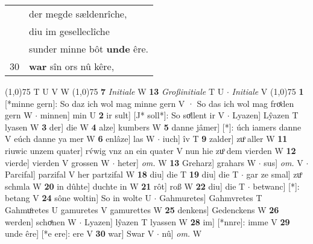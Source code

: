 \documentclass[8pt,a4paper,notitlepage]{article}
\begin{document}
\begin{table}[ht]
\begin{minipage}[t]{0.5\linewidth}
\begin{tabular}{rl}
 & der megde sældenrîche,\\ 
 & diu im geselleclîche\\ 
 & sunder minne bôt \textbf{unde} êre.\\ 
30 & \textbf{war} sîn ors nû kêre,\\ 
\end{tabular}
\scriptsize
\line(1,0){75} \newline
T U V W \newline
\line(1,0){75} \newline
\textbf{7} \textit{Initiale} W  \textbf{13} \textit{Großinitiale} T U   $\cdot$ \textit{Initiale} V  \newline
\line(1,0){75} \newline
\textbf{1} [*minne gern]: So daz ich wol mag minne gern V · So das ich wol mag froͤden gern W  $\cdot$ minnen] min U \textbf{2} ir sult] [J* soll*]: So soͤllent ir V  $\cdot$ Lyazen] Lŷazen T lyasen W \textbf{3} der] die W \textbf{4} alze] kumbers W \textbf{5} danne jâmer] [*]: úch iamers danne V eúch danne ya mer W \textbf{6} enlâze] las W  $\cdot$ iuch] îv T \textbf{9} zalder] zuͦ aller W \textbf{11} riuwic unzem quater] rv́wig vnz an ein quater V nun hie zuͦ dem vierden W \textbf{12} vierde] vierden V grossen W  $\cdot$ heter] \textit{om.} W \textbf{13} Greharz] grahars W  $\cdot$ sus] \textit{om.} V  $\cdot$ Parcifal] parzifal V her partzifal W \textbf{18} diu] die T \textbf{19} diu] die T  $\cdot$ gar ze smal] zuͦ schmla W \textbf{20} in dûhte] duchte in W \textbf{21} rôt] roß W \textbf{22} diu] die T  $\cdot$ betwanc] [*]: betang V \textbf{24} sône woltin] So in wolte U  $\cdot$ Gahmuretes] Gahmvretes T Gahmuͦretes U gamuretes V gamurettes W \textbf{25} denkens] Gedenckens W \textbf{26} werden] schoͤnen W  $\cdot$ Lyazen] lŷazen T lyassen W \textbf{28} im] [*nnre]: imme V \textbf{29} unde êre] [*e ere]: ere V \textbf{30} war] Swar V  $\cdot$ nû] \textit{om.} W \newline
\end{minipage}
\end{table}
\end{document}
